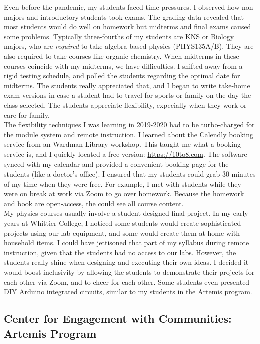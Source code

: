 \documentclass[../../../main.tex]{subfiles}
\begin{document}
Even before the pandemic, my students faced time-pressures.  I observed how non-majors and introductory students took exams.  The grading data revealed that most students would do well on homework but midterms and final exams caused some problems.  Typically three-fourths of my students are KNS or Biology majors, who are \textit{required} to take algebra-based physics (PHYS135A/B).  They are also required to take courses like organic chemistry.  When midterms in these courses coincide with my midterms, we have difficulties.  I shifted away from a rigid testing schedule, and polled the students regarding the optimal date for midterms.  The students really appreciated that, and I began to write take-home exam versions in case a student had to travel for sports or family on the day the class selected.  The students appreciate flexibility, expecially when they work or care for family.
\\
\vspace{0.25cm}
The flexibility techniques I was learning in 2019-2020 had to be turbo-charged for the module system and remote instruction.  I learned about the Calendly booking service from an Wardman Library workshop.  This taught me what a booking service is, and I quickly located a free version: \url{https://10to8.com}.  The software synced with my calendar and provided a convenient booking page for the students (like a doctor's office).  I ensured that my students could grab 30 minutes of my time when they were free.  For example, I met with students while they were on break at work via Zoom to go over homework.  Because the homework and book are open-access, the could see all course content.
\\
\vspace{0.25cm}
My physics courses usually involve a student-designed final project.  In my early years at Whittier College, I noticed some students would create sophisticated projects using our lab equipment, and some would create them at home with household items.  I could have jettisoned that part of my syllabus during remote instruction, given that the students had no access to our labs.  However, the students really shine when designing and executing their own ideas.  I decided it would boost inclusivity by allowing the students to demonstrate their projects for each other via Zoom, and to cheer for each other.  Some students even presented DIY Arduino integrated circuits, similar to my students in the Artemis program.

\subsection{Center for Engagement with Communities: Artemis Program}
\label{sec:cec}
\end{document}

